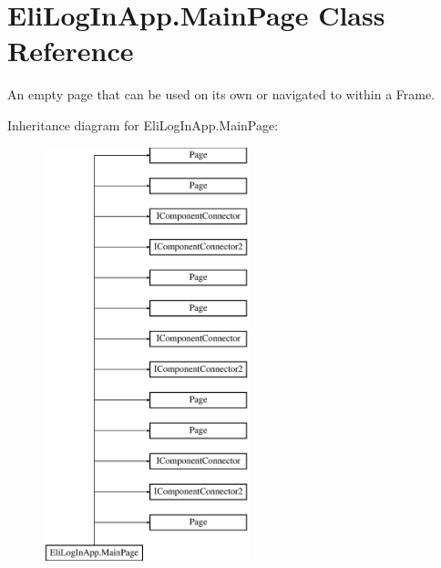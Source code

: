 \hypertarget{class_eli_log_in_app_1_1_main_page}{}\section{Eli\+Log\+In\+App.\+Main\+Page Class Reference}
\label{class_eli_log_in_app_1_1_main_page}


An empty page that can be used on its own or navigated to within a Frame.  


Inheritance diagram for Eli\+Log\+In\+App.\+Main\+Page\+:\begin{figure}[H]
\begin{center}
\leavevmode
\includegraphics[height=12.000000cm]{d6/dd7/class_eli_log_in_app_1_1_main_page}
\end{center}
\end{figure}
